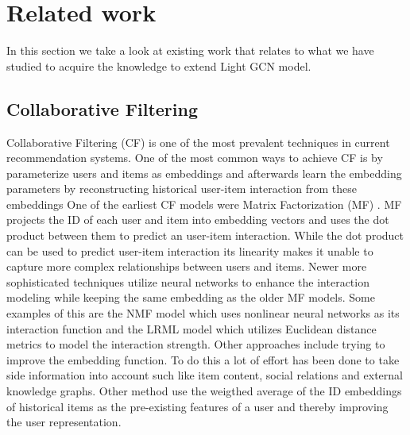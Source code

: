 \section{Related work}
In this section we take a look at existing work that relates to what we have studied to acquire the knowledge to extend Light GCN model.

\subsection{Collaborative Filtering}
Collaborative Filtering (CF) is one of the most prevalent techniques in current recommendation systems\cite{YT_rec,NGCF_2019,Pint_rec,COL_MEM_NET}.
One of the most common ways to achieve CF is by parameterize users and items as embeddings and afterwards learn the embedding parameters by reconstructing historical user-item interaction from these embeddings\cite{NGCF_2019}
One of the earliest CF models were Matrix Factorization (MF) \cite{Matrix-factorization-techniques, BAY_PER_RAN}.
MF  projects the ID of each user and item into embedding vectors and uses the dot product between them to predict an user-item interaction.
While the dot product can be used to predict user-item interaction its linearity makes it unable to capture more complex relationships between users and items.
Newer more sophisticated techniques utilize neural networks to enhance the interaction modeling while keeping the same embedding as the older MF models.
Some examples of this are the NMF model\cite{NEU_COL_FIL} which uses nonlinear neural networks as its interaction function and the LRML model\cite{LAT_REL_MET} which utilizes Euclidean distance metrics to model the interaction strength.
Other approaches include trying to improve the embedding function.
To do this a lot of effort has been done to take side information into account such like item content\cite{ATT_COL_FIL_MUL}, social relations\cite{REC_SOC_USE} and external knowledge graphs\cite{KGAT, KNO_GRA_REC}.
Other method use the weigthed average of the ID embeddings of historical items as the pre-existing features of a user and thereby improving the user representation\cite{SVD_PLUSPLUS,FISM}.
 
